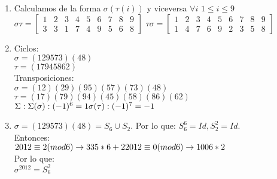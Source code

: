 \begin{solution}

\begin{enumerate}
\item Calculamos de la forma $\sigma(\tau(i))$ y viceversa $\forall i$ $1\leq i \leq 9$ \\
$\sigma\tau = \begin{bmatrix} 1 & 2 & 3 & 4 & 5 & 6 & 7 & 8 & 9 \\
                                3 & 3 & 1 & 7 & 4 & 9 & 5 & 6 & 8
                          \end{bmatrix}$                
$ \tau\sigma = \begin{bmatrix} 1 & 2 & 3 & 4 & 5 & 6 & 7 & 8 & 9 \\
                                1 & 4 & 7 & 6 & 9 & 2 & 3 & 5 & 8
                         \end{bmatrix}$ \\

\item Ciclos:\\
      $\sigma = ( 1 2 9 5 7 3 )( 4 8 )$ \\
      $\tau = ( 1 7 9 4 5 8 6 2 )$ \\
      Transposiciones: \\
      $\sigma = ( 1 2 )( 2 9 )( 9 5 )( 5 7 )( 7 3 )( 4 8 )$ \\
      $\tau = ( 1 7 )( 7 9 )( 9 4 )( 4 5 )( 5 8 )( 8 6 )( 6 2 )$\\
      $\Sigma : \\
      \Sigma(\sigma):(-1)^6 = 1 \\
      \sigma(\tau): (-1)^7= -1 $\\
\item $\sigma = ( 1 2 9 5 7 3 )( 4 8 ) = S_6 \cup S_2$. Por lo que: $S_6^6=Id , S_2^2= Id$.\\
Entonces: \\
$2012 \equiv 2 (mod 6) \to 335*6+2 \\
 2012 \equiv 0 (mod 6) \to 1006*2 $\\
 Por lo que:\\
 $\sigma^2012 = S_6^2$
\end{enumerate}

\end{solution}
